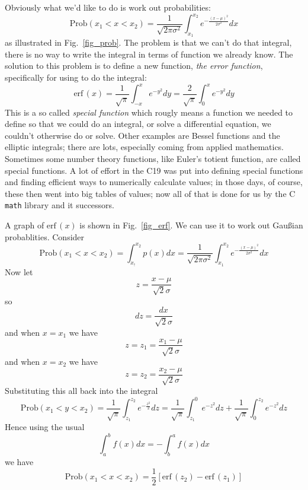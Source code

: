 \documentclass[11pt,a4paper]{scrartcl}
\begin{document}
Obviously what we'd like to do is work out probabilities:
\begin{equation}
\mbox{Prob}(x_1<x<x_2)=\frac{1}{\sqrt{2\pi\sigma^2}}\int_{x_1}^{x_2} e^{-\frac{(x-\mu)^2}{2\sigma^2}}dx
\end{equation}
as illustrated in Fig.~\ref{fig_prob}. The problem is that we can't
do that integral, there is no way to write the integral in terms of
function we already know. The solution to this problem is to define a
new function, \textsl{the error function}, specifically for using to
do the integral:
\begin{equation}
\mbox{erf}\,(x)=\frac{1}{\sqrt{\pi}}\int_{-x}^xe^{-y^2}dy=\frac{2}{\sqrt{\pi}}\int_0^xe^{-y^2}dy
\end{equation}
This is a so called \textsl{special function} which rougly means a
function we needed to define so that we could do an integral, or solve
a differential equation, we couldn't otherwise do or solve. Other
examples are Bessel functions and the elliptic integrals; there are
lots, especially coming from applied mathematics. Sometimes some
number theory functions, like Euler's totient function, are called
special functions. A lot of effort in the C19 was put into defining
special functions and finding efficient ways to numerically calculate
values; in those days, of course, these then went into big tables of
values; now all of that is done for us by the C \texttt{math} library
and it successors.

A graph of $\mbox{erf}\,(x)$ is shown in Fig.~\ref{fig_erf}. We can use it to work out Gau\ss{}ian probablities. Consider
\begin{equation}
\mbox{Prob}(x_1<x<x_2)=\int_{x_!}^{x_2} p(x)dx=\frac{1}{\sqrt{2\pi\sigma^2}}\int_{x_1}^{x_2} e^{-\frac{(x-\mu)^2}{2\sigma^2}}dx 
\end{equation}
Now let
\begin{equation}
z=\frac{x-\mu}{\sqrt{2}\sigma}
\end{equation}
so 
\begin{equation}
dz=\frac{dx}{\sqrt{2}\sigma}
\end{equation}
and when $x=x_1$ we have
\begin{equation}
z=z_1=\frac{x_1-\mu}{\sqrt{2}\sigma}
\end{equation}
and when $x=x_2$ we have
\begin{equation}
z=z_2=\frac{x_2-\mu}{\sqrt{2}\sigma}
\end{equation}
Substituting this all back into the integral
\begin{equation}
\mbox{Prob}(x_1<y<x_2)=\frac{1}{\sqrt{\pi}}\int_{z_1}^{z_2} e^{-\frac{z^2}{2}}dz=\frac{1}{\sqrt{\pi}}\int_{z_1}^{0} e^{-z^2}dz+\frac{1}{\sqrt{\pi}}\int_{0}^{z_2} e^{-z^2}dz
\end{equation}
Hence using the usual 
\begin{equation}
\int_a^bf(x)dx=-\int_b^a f(x)dx
\end{equation}
we have
\begin{equation}
\mbox{Prob}(x_1<x<x_2)=\frac{1}{2}[\mbox{erf}\,(z_2)-\mbox{erf}\,(z_1)]
\end{equation}
\end{document}
